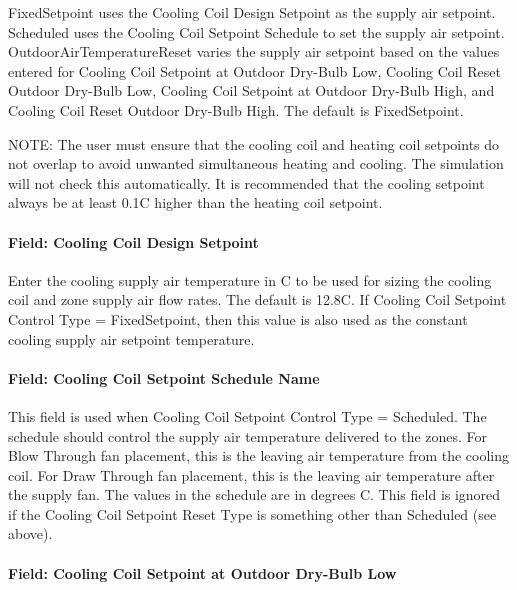 FixedSetpoint uses the Cooling Coil Design Setpoint as the supply air setpoint. Scheduled uses the Cooling Coil Setpoint Schedule to set the supply air setpoint. OutdoorAirTemperatureReset varies the supply air setpoint based on the values entered for Cooling Coil Setpoint at Outdoor Dry-Bulb Low, Cooling Coil Reset Outdoor Dry-Bulb Low, Cooling Coil Setpoint at Outdoor Dry-Bulb High, and Cooling Coil Reset Outdoor Dry-Bulb High. The default is FixedSetpoint.

NOTE: The user must ensure that the cooling coil and heating coil setpoints do not overlap to avoid unwanted simultaneous heating and cooling. The simulation will not check this automatically. It is recommended that the cooling setpoint always be at least 0.1C higher than the heating coil setpoint.

\paragraph{Field: Cooling Coil Design Setpoint}\label{field-cooling-coil-design-setpoint-3}

Enter the cooling supply air temperature in C to be used for sizing the cooling coil and zone supply air flow rates. The default is 12.8C. If Cooling Coil Setpoint Control Type = FixedSetpoint, then this value is also used as the constant cooling supply air setpoint temperature.

\paragraph{Field: Cooling Coil Setpoint Schedule Name}\label{field-cooling-coil-setpoint-schedule-name-4}

This field is used when Cooling Coil Setpoint Control Type = Scheduled. The schedule should control the supply air temperature delivered to the zones. For Blow Through fan placement, this is the leaving air temperature from the cooling coil. For Draw Through fan placement, this is the leaving air temperature after the supply fan. The values in the schedule are in degrees C. This field is ignored if the Cooling Coil Setpoint Reset Type is something other than Scheduled (see above).

\paragraph{Field: Cooling Coil Setpoint at Outdoor Dry-Bulb Low}\label{field-cooling-coil-setpoint-at-outdoor-dry-bulb-low-2}

